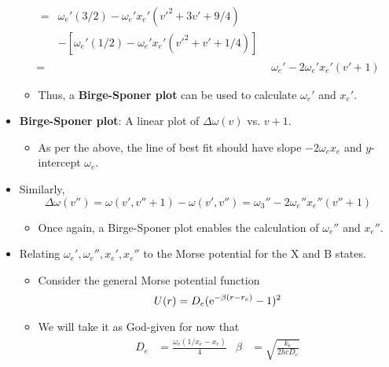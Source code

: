 \documentclass[../notes.tex]{subfiles}
\begin{document}
\begin{itemize}
\begin{align*}
\begin{split}
        \end{split}\\
        \begin{split}
            ={}& \omega_e'(3/2)-\omega_e'x_e'\left( {v'}^2+3v'+9/4 \right)\\
            &-\left[ \omega_e'(1/2)-\omega_e'x_e'\left( {v'}^2+v'+1/4 \right) \right]
        \end{split}\\
        ={}& \omega_e'-2\omega_e'x_e'(v'+1)
    \end{align*}
    \begin{itemize}
        \item Thus, a \textbf{Birge-Sponer plot} can be used to calculate $\omega_e'$ and $x_e'$.
    \end{itemize}
    \item \textbf{Birge-Sponer plot}: A linear plot of $\Delta\omega(v)$ vs. $v+1$.
    \begin{itemize}
        \item As per the above, the line of best fit should have slope $-2\omega_ex_e$ and $y$-intercept $\omega_e$.
    \end{itemize}
    \item Similarly,
    \begin{equation*}
        \Delta\omega(v'') = \omega(v',v''+1)-\omega(v',v'')
        = \omega_3''-2\omega_e''x_e''(v''+1)
    \end{equation*}
    \begin{itemize}
        \item Once again, a Birge-Sponer plot enables the calculation of $\omega_e''$ and $x_e''$.
    \end{itemize}
    \item Relating $\omega_e',\omega_e'',x_e',x_e''$ to the Morse potential for the X and B states.
    \begin{itemize}
        \item Consider the general Morse potential function
        \begin{equation*}
            U(r) = D_e(\e[-\beta(r-r_e)]-1)^2
        \end{equation*}
        \item We will take it as God-given for now that
        \begin{align*}
            D_e &= \frac{\omega_e(1/x_e-x_e)}{4}&
            \beta &= \sqrt{\frac{k_e}{2hcD_e}}
        \end{align*}
        \begin{itemize}

\end{itemize}
\end{itemize}
\end{itemize}
\end{document}
